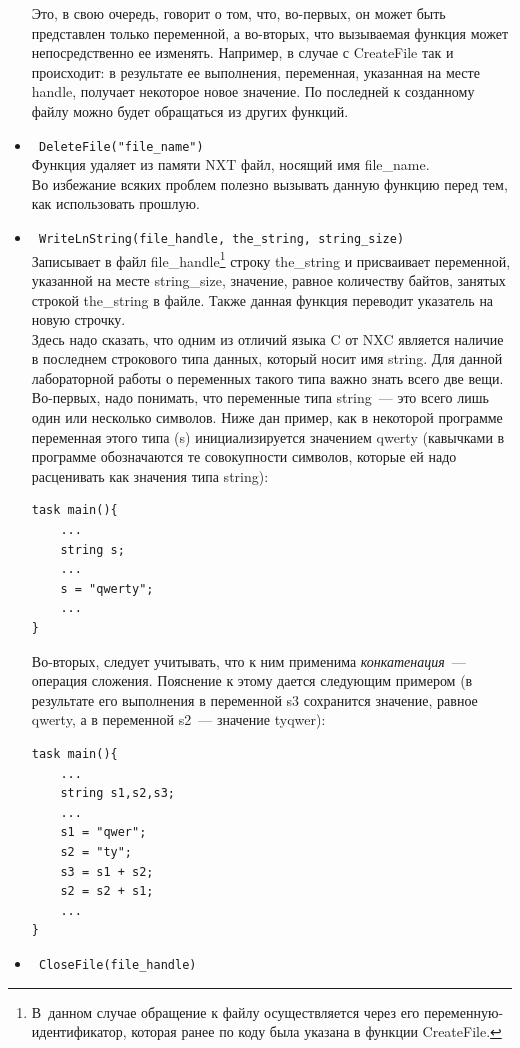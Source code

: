 \documentclass[12pt,a4paper,openany]{extarticle}
\begin{document}
\begin{itemize}
{Это, в свою очередь, говорит о том, что, во-первых, он может быть представлен только переменной, а во-вторых, что вызываемая функция может непосредственно ее изменять. 
Например, в случае с CreateFile так и происходит: в результате ее выполнения, переменная, указанная на месте handle, получает некоторое новое значение.}
По последней к созданному файлу можно будет обращаться из других функций.
\item \verb| DeleteFile("file_name")|\\
Функция удаляет из памяти NXT файл, носящий имя file\_name. 
\\Во избежание всяких проблем полезно вызывать данную функцию перед тем, как использовать прошлую.
\item \verb| WriteLnString(file_handle, the_string, string_size)|\\
Записывает в файл file\_handle\footnote{В~данном случае обращение к файлу осуществляется через его переменную-идентификатор, которая ранее по коду была указана в функции CreateFile.} строку the\_string и присваивает переменной, указанной на месте string\_size, значение, равное количеству байтов, занятых строкой the\_string в файле. 
Также данная функция переводит указатель на новую строчку.\\
Здесь надо сказать, что одним из отличий языка C от NXC является наличие в последнем строкового типа данных, который носит имя string. 
Для данной лабораторной работы о переменных такого типа важно знать всего две вещи. 
Во-первых, надо понимать, что переменные типа string~--- это всего лишь один или несколько символов. 
Ниже дан пример, как в некоторой программе переменная этого типа (s) инициализируется значением qwerty (кавычками в программе обозначаются те совокупности символов, которые ей надо расценивать как значения типа string):
\begin{verbatim}
task main(){
    ...
    string s;
    ...
    s = "qwerty";
    ...
}
\end{verbatim}
Во-вторых, следует учитывать, что к ним применима \textit{конкатенация}~--- операция сложения. 
Пояснение к этому дается следующим примером (в результате его выполнения в переменной s3 сохранится значение, равное qwerty, а в переменной s2~--- значение tyqwer):
\begin{verbatim}
task main(){
    ...
    string s1,s2,s3;
    ...
    s1 = "qwer";
    s2 = "ty";
    s3 = s1 + s2;
    s2 = s2 + s1;
    ...
}
\end{verbatim}
\item \verb| CloseFile(file_handle)|\\

\end{itemize}
\end{document}
